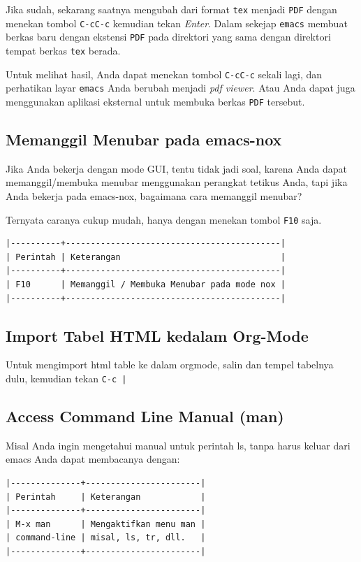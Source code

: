 \documentclass{article}
\begin{document}
Jika sudah, sekarang saatnya mengubah dari format \verb=tex= menjadi
\verb=PDF= dengan menekan tombol \verb=C-cC-c= kemudian tekan \emph{Enter}.
Dalam sekejap \verb=emacs= membuat berkas baru dengan ekstensi \verb=PDF= pada
direktori yang sama dengan direktori tempat berkas \verb=tex= berada.

Untuk melihat hasil, Anda dapat menekan tombol \verb=C-cC-c= sekali lagi, 
dan perhatikan layar \verb=emacs= Anda berubah menjadi \emph{pdf viewer}. Atau
Anda dapat juga menggunakan aplikasi eksternal untuk membuka berkas \verb=PDF=
tersebut.

\subsection{Memanggil Menubar pada emacs-nox}
Jika Anda bekerja dengan mode GUI, tentu tidak jadi soal, karena Anda dapat
memanggil/membuka menubar menggunakan perangkat tetikus Anda, tapi jika
Anda bekerja pada emacs-nox, bagaimana cara memanggil menubar? 

Ternyata caranya cukup mudah, hanya dengan menekan tombol \verb=F10= saja.

\begin{verbatim}
|----------+-------------------------------------------|
| Perintah | Keterangan                                |
|----------+-------------------------------------------|
| F10      | Memanggil / Membuka Menubar pada mode nox |
|----------+-------------------------------------------|
\end{verbatim}

\subsection{Import Tabel HTML kedalam Org-Mode}
Untuk mengimport html table ke dalam orgmode, salin dan tempel tabelnya dulu, kemudian tekan 
\verb=C-c |=

\subsection{Access Command Line Manual (man)}
Misal Anda ingin mengetahui manual untuk perintah ls, tanpa harus keluar dari
emacs Anda dapat membacanya dengan:

\begin{verbatim}
|--------------+-----------------------|
| Perintah     | Keterangan            |
|--------------+-----------------------|
| M-x man      | Mengaktifkan menu man |
| command-line | misal, ls, tr, dll.   |
|--------------+-----------------------|
\end{verbatim}
\end{document}
